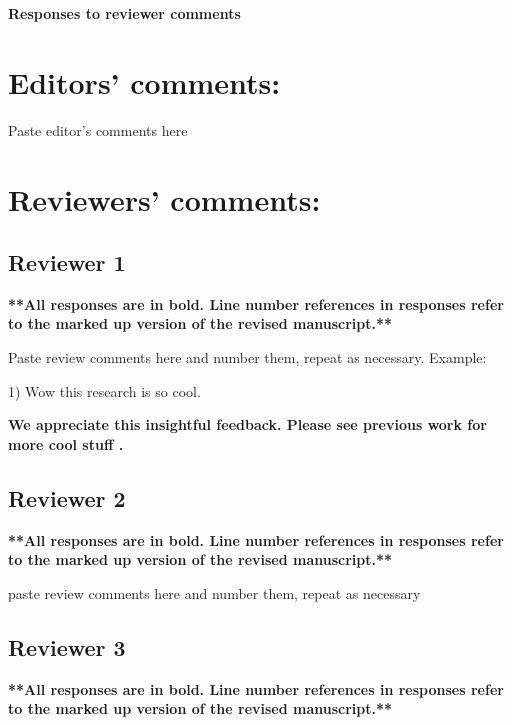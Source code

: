 \documentclass[12pt, letterpaper]{article}
\newenvironment{response}{\bfseries}{}
\begin{document}
\begin{center}
    \textbf{\Large{Responses to reviewer comments}}
\end{center}

\section*{Editors’ comments:}

Paste editor's comments here

\section*{Reviewers' comments:}

\subsection*{Reviewer 1}

\begin{center}
    \textbf{**All responses are in bold. Line number references in responses refer to the marked up version of the revised manuscript.**}
\end{center}

Paste review comments here and number them, repeat as necessary. Example:

1) Wow this research is so cool. 

\begin{response}
We appreciate this insightful feedback. Please see previous work for more cool stuff \citep{corbett-detig_natural_2015}.
\end{response}

\subsection*{Reviewer 2}

\begin{center}
    \textbf{**All responses are in bold. Line number references in responses refer to the marked up version of the revised manuscript.**}
\end{center}

paste review comments here and number them, repeat as necessary

\subsection*{Reviewer 3}

\begin{center}
    \textbf{**All responses are in bold. Line number references in responses refer to the marked up version of the revised manuscript.**}
\end{center}




\end{document}
